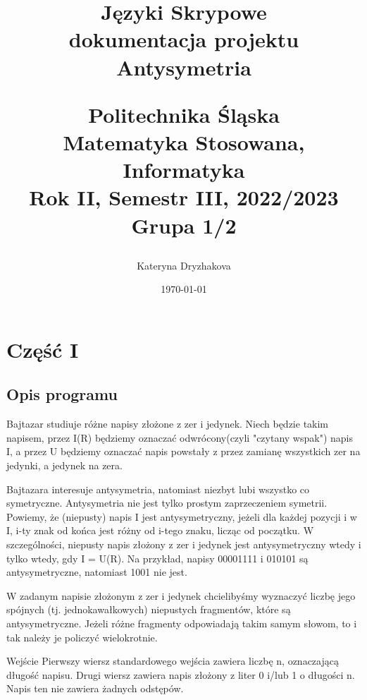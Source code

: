 \documentclass[12pt,a4paper]{article}
\begin{document}
	
	\title{Języki Skrypowe\\\small{dokumentacja projektu Antysymetria}
	\begin{center}
 		\begin{large}
 		Politechnika Śląska\\Matematyka Stosowana, Informatyka\\Rok II, Semestr III, 2022/2023\\Grupa 1/2					\author{Kateryna Dryzhakova}
 		\end{large}
	\end{center}
	\date{\today}}

	\maketitle
	\newpage
	\section*{Część I}
	\subsection*{Opis programu}

	Bajtazar studiuje różne napisy złożone z zer i jedynek. Niech  będzie takim napisem, przez I(R) będziemy oznaczać odwrócony(czyli "czytany wspak") napis I, a przez U będziemy oznaczać napis powstały z  przez zamianę wszystkich zer na jedynki, a jedynek na zera.

Bajtazara interesuje antysymetria, natomiast niezbyt lubi wszystko co symetryczne. Antysymetria nie jest tylko prostym zaprzeczeniem symetrii. Powiemy, że (niepusty) napis I jest antysymetryczny, jeżeli dla każdej pozycji i w I, i-ty znak od końca jest różny od i-tego znaku, licząc od początku. W szczególności, niepusty napis  złożony z zer i jedynek jest antysymetryczny wtedy i tylko wtedy, gdy I = U(R). Na przykład, napisy 00001111 i 010101 są antysymetryczne, natomiast 1001 nie jest.

W zadanym napisie złożonym z zer i jedynek chcielibyśmy wyznaczyć liczbę jego spójnych (tj. jednokawałkowych) niepustych fragmentów, które są antysymetryczne. Jeżeli różne fragmenty odpowiadają takim samym słowom, to i tak należy je policzyć wielokrotnie.

Wejście
Pierwszy wiersz standardowego wejścia zawiera liczbę n, oznaczającą długość napisu. Drugi wiersz zawiera napis złożony z liter 0 i/lub 1 o długości n. Napis ten nie zawiera żadnych odstępów.
\end{document}

